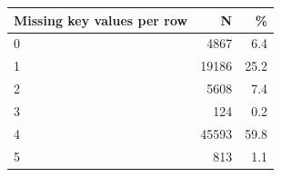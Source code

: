 \begin{threeparttable}


\begin{tabular}{@{}lrr@{}}


\toprule


\textbf{Missing key values per row} & \textbf{N} & \textbf{\%} \\


\midrule


\midrule
0           &        4867&         6.4\\
1           &       19186&        25.2\\
2           &        5608&         7.4\\
3           &         124&         0.2\\
4           &       45593&        59.8\\
5           &         813&         1.1\\
\bottomrule


\end{tabular}


\end{threeparttable}
